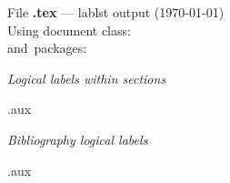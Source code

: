 \documentclass{\lablstclass}
\begin{document}
\mbox{}

\vspace{-3cm}

{\LARGE  File \textbf{\lablstfile.tex} --- lablst output}
{\Large (\today)
\\[0.5\baselineskip]
Using document class:\quad \lablstclass\\
  \mbox{\phantom{Using }and packages:\quad \lablstpackages}
 }

\vspace{2\baselineskip}

\makeatletter

%
\let \@mlabel \@gobbletwo

%
\let \protect \relax

%
\let \raggedright  \relax

%
\def \@writefile #1#2{%
  \def\lablst@tempa{#1}%
  \def\lablst@tempb{toc}%
  \ifx \lablst@tempa\lablst@tempb
    \par{#2}\par\nobreak
    \vspace{3pt}%
  \fi
}

%
\def\@lablstverb#1{%
  \def\lablst@tempa{#1}%
  {\ttfamily\expandafter\strip@prefix\meaning\lablst@tempa}}%


%
\def \newlabel #1#2{%
  \par
  \hbox to \textwidth{%
    \hfill\makebox[10em][r]{\@lablstverb{#1}}%
    \hspace{1em}\makebox[4.5em][l]{\@firstoftwo #2}%
    Page:
    \makebox[2.5em][r]{\@secondoftwo #2}%
    \hspace{4em}}\par
}

\let \bibcite \@gobbletwo

{\Large \sl Logical labels within sections}

 \lablstfile.aux


%
\def \bibcite #1#2{\par
  \hbox to \textwidth{%
  \hfill\makebox[2in][r]{\@lablstverb{#1}}\hspace{1em}[#2]\hspace{4em}}}

\let \newlabel \@gobbletwo
\let \@writefile \@gobbletwo

\par
\vspace{2\baselineskip}

{\Large \sl Bibliography logical labels}

 \lablstfile.aux
\end{document}
